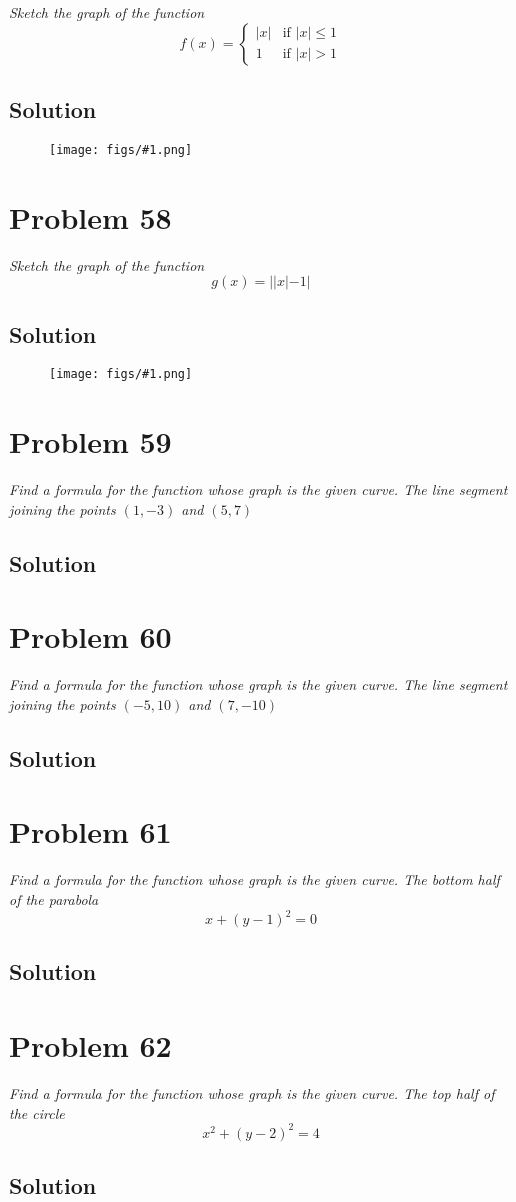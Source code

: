 \documentclass[11pt]{article}
\newcommand{\soln}{\subsection*}
\newcommand{\qn}{\textit}
\newcommand{\imgsoln}[1]{
	\begin{figure}[h]
		\centering
		\texttt{[image: figs/\#1.png]}
	\end{figure}
}
\begin{document}
\qn{Sketch the graph of the function}
\begin{equation}
	f(x)=
	\begin{cases}
		|x| & \text{if } |x| \le 1\\
		1 & \text{if } |x| > 1
	\end{cases}
\end{equation}

\soln{Solution}
\imgsoln{1.1.57-ans}

\section*{Problem 58}

\qn{Sketch the graph of the function $$g(x)=||x|-1|$$}

\soln{Solution}
\imgsoln{1.1.58-ans}

\section*{Problem 59}

\qn{Find a formula for the function whose graph is the given curve. The line segment joining the points $(1, -3)$ and $(5,7)$}

\soln{Solution}

\section*{Problem 60}

\qn{Find a formula for the function whose graph is the given curve. The line segment joining the points $(-5, 10)$ and $(7, -10)$}

\soln{Solution}

\section*{Problem 61}

\qn{Find a formula for the function whose graph is the given curve. The bottom half of the parabola $$x+(y-1)^2=0$$ }

\soln{Solution}

\section*{Problem 62}

\qn{Find a formula for the function whose graph is the given curve. The top half of the circle $$x^2+(y-2)^2=4$$}

\soln{Solution}
\end{document}
